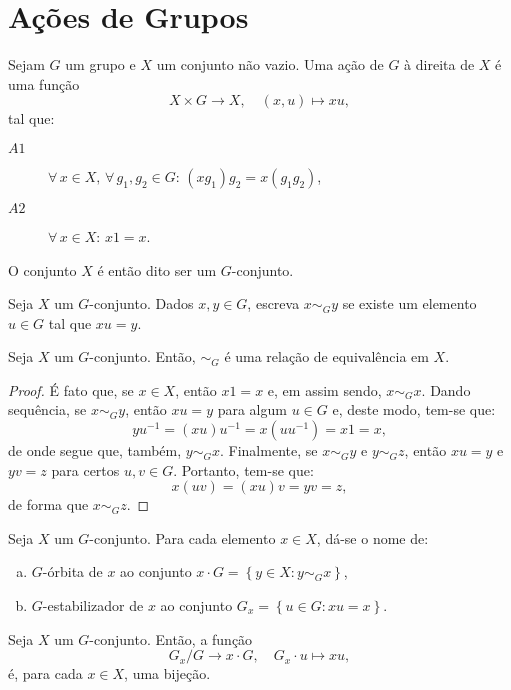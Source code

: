 \section{Ações de Grupos}\label{sec:ações-de-grupos}

\begin{definition}
  Sejam $G$ um grupo e $X$ um conjunto não vazio. Uma ação de $G$ à direita de $X$ é uma função
  \[
    X\times{G}\to{X},\quad{(x,u)\mapsto{xu}},
  \]
  tal que:
  \begin{description}
    \item[$A1$] $\forall\,x\in{X},\,\forall\,g_{1},g_{2}\in{G}$: $(xg_{1})g_{2}=x(g_{1}g_{2})$,
    \item[$A2$] $\forall\,x\in{X}$: $x1=x$.
  \end{description}
  O conjunto $X$ é então dito ser um $G$-conjunto.
\end{definition}

Seja $X$ um $G$-conjunto. Dados $x,y\in{G}$, escreva $x\sim_{G}{y}$ se existe um elemento $u\in{G}$ tal que $xu=y$.

\begin{proposition}
  Seja $X$ um $G$-conjunto. Então, $\sim_{G}$ é uma relação de equivalência em $X$.
\end{proposition}

\begin{proof}
  É fato que, se $x\in{X}$, então $x1=x$ e, em assim sendo, $x\sim_{G}x$. Dando sequência, se $x\sim_{G}y$, então $xu=y$ para algum $u\in{G}$ e, deste modo, tem-se que:
  \[
    yu^{-1}=(xu)u^{-1}=x(uu^{-1})=x1=x,
  \]
  de onde segue que, também, $y\sim_{G}x$. Finalmente, se $x\sim_{G}y$ e $y\sim_{G}z$, então $xu=y$ e $yv=z$ para certos $u,v\in{G}$. Portanto, tem-se que:
  \[
    x(uv)=(xu)v=yv=z,
  \]
  de forma que $x\sim_{G}z$.
\end{proof}

\begin{definition}
  Seja $X$ um $G$-conjunto. Para cada elemento $x\in{X}$, dá-se o nome de:
  \begin{enumerate}[a)]
    \item $G$-órbita de $x$ ao conjunto $x\cdot{G}=\left\{y\in{X}:y\sim_{G}x\right\}$,
    \item $G$-estabilizador de $x$ ao conjunto $G_{x}=\left\{u\in{G}:xu=x\right\}$.
  \end{enumerate}
\end{definition}

\begin{proposition}
  Seja $X$ um $G$-conjunto. Então, a função
  \[
    G_{x}/G\to{x\cdot{G}},\quad{G_{x}\cdot{u}\mapsto{xu}},
  \]
  é, para cada $x\in{X}$, uma bijeção.
\end{proposition}

